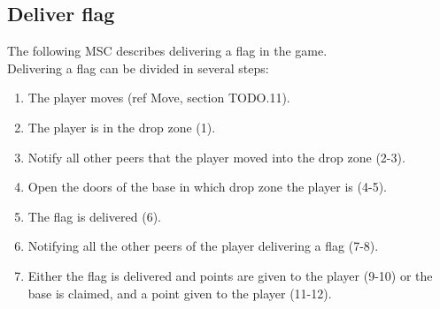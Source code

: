 \documentclass[a4paper,twoside,11pt]{article}
\begin{document}
\subsection{Deliver flag}
The following MSC describes delivering a flag in the game.\\
Delivering a flag can be divided in several steps:
\begin{enumerate}
\item The player moves (ref Move, section TODO.11).
\item The player is in the drop zone (1).
\item Notify all other peers that the player moved into the drop zone (2-3).
\item Open the doors of the base in which drop zone the player is (4-5).
\item The flag is delivered (6).
\item Notifying all the other peers of the player delivering a flag (7-8).
\item Either the flag is delivered and points are given to the player (9-10) or the base is claimed, and a point given to the player (11-12).  
\end{enumerate}
\end{document}
